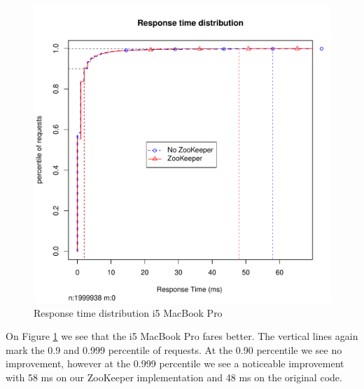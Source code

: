 \clearpage
\begin{figure}[h]
    \centering
    \includegraphics[width=1.0\textwidth]{results/distribution/distribution_knut}
    \caption{Response time distribution i5 MacBook Pro}
    \label{fig:dist_knut}
\end{figure}

On Figure \ref{fig:dist_knut} we see that the i5 MacBook Pro fares better. The vertical lines again mark the 0.9 and 0.999 percentile of requests. At the 0.90 percentile we see no improvement, however at the 0.999 percentile we see a noticeable improvement with 58 ms on our ZooKeeper implementation and 48 ms on the original code.  


